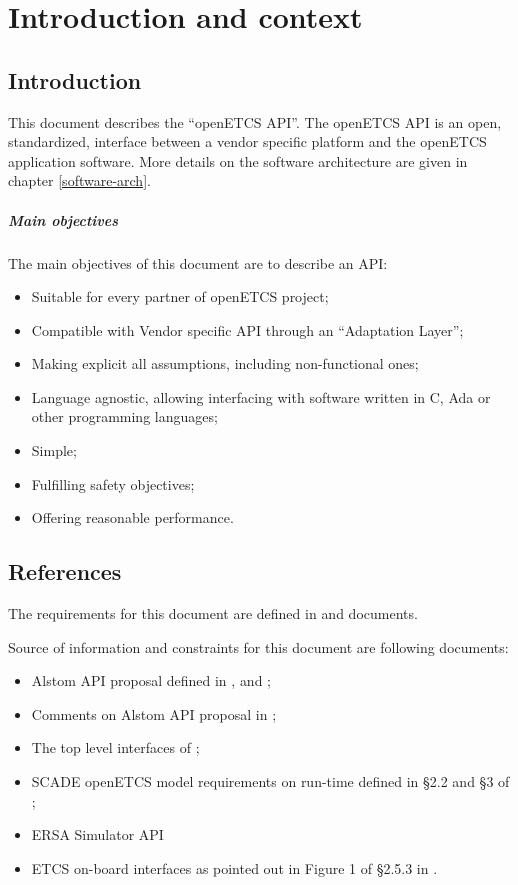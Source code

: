 \chapter{Introduction and context}

\section{Introduction}

This document describes the ``openETCS API''. The openETCS API is an
open, standardized, interface between a vendor specific platform and
the openETCS application software. More details on the software
architecture are given in chapter \ref{software-arch}.

\paragraph{Main objectives} The main objectives of this document are
to describe an API:
\begin{itemize}
\item Suitable for every partner of openETCS project;
\item Compatible with Vendor specific API through an ``Adaptation Layer'';
\item Making explicit all assumptions, including non-functional ones;
\item Language agnostic, allowing interfacing with software written
  in C, Ada or other programming languages;
\item Simple;
\item Fulfilling safety objectives;
\item Offering reasonable performance.
\end{itemize}

\section{References}

The requirements for this document are defined in \cite[§7.1]{D2.6-9} and
\cite{API-req-2} documents.

Source of information and constraints for this document are following
documents:
\begin{itemize}
\item Alstom API proposal defined in \cite{alstom-api},
  \cite{alstom-api-app-layer} and \cite{alstom-api-data-dict};
\item Comments on Alstom API proposal in \cite{alstom-api-comments};
\item The top level interfaces of \cite{sysml-model};
\item SCADE openETCS model requirements on run-time defined in §2.2
  and §3 of \cite{scade-modelling-guide};
\item ERSA Simulator API  %
\item ETCS on-board interfaces as pointed out in Figure 1 of §2.5.3 in
  \cite{subset-026}.
\end{itemize}




